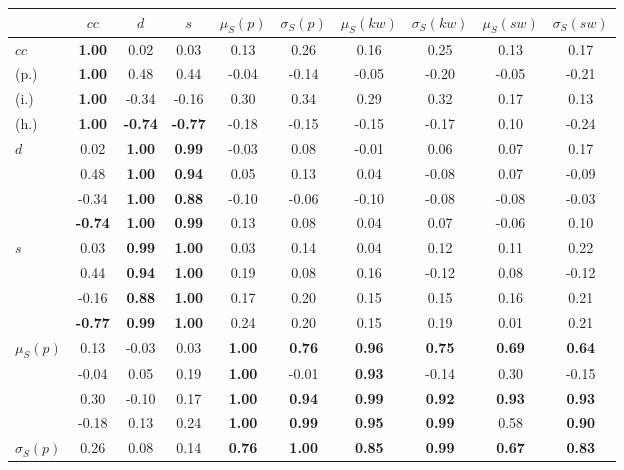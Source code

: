 \begin{table*}[h!]
\begin{center}
\begin{tabular}{| l || c | c | c | c | c | c | c | c | c |}\hline
 & $cc$ & $d$ & $s$ & $\mu_S(p)$ & $\sigma_S(p)$ & $\mu_S(kw)$ & $\sigma_S(kw)$ & $\mu_S(sw)$ & $\sigma_S(sw)$ \\\hline\hline
$cc$ & {\bf 1.00} & 0.02 & 0.03 & 0.13 & 0.26 & 0.16 & 0.25 & 0.13 & 0.17 \\
(p.) & {\bf 1.00} & 0.48 & 0.44 & -0.04 & -0.14 & -0.05 & -0.20 & -0.05 & -0.21 \\
(i.) & {\bf 1.00} & -0.34 & -0.16 & 0.30 & 0.34 & 0.29 & 0.32 & 0.17 & 0.13 \\
(h.) & {\bf 1.00} & {\bf -0.74} & {\bf -0.77} & -0.18 & -0.15 & -0.15 & -0.17 & 0.10 & -0.24 \\\hline
$d$ & 0.02 & {\bf 1.00} & {\bf 0.99} & -0.03 & 0.08 & -0.01 & 0.06 & 0.07 & 0.17 \\
 & 0.48 & {\bf 1.00} & {\bf 0.94} & 0.05 & 0.13 & 0.04 & -0.08 & 0.07 & -0.09 \\
 & -0.34 & {\bf 1.00} & {\bf 0.88} & -0.10 & -0.06 & -0.10 & -0.08 & -0.08 & -0.03 \\
 & {\bf -0.74} & {\bf 1.00} & {\bf 0.99} & 0.13 & 0.08 & 0.04 & 0.07 & -0.06 & 0.10 \\\hline
$s$ & 0.03 & {\bf 0.99} & {\bf 1.00} & 0.03 & 0.14 & 0.04 & 0.12 & 0.11 & 0.22 \\
 & 0.44 & {\bf 0.94} & {\bf 1.00} & 0.19 & 0.08 & 0.16 & -0.12 & 0.08 & -0.12 \\
 & -0.16 & {\bf 0.88} & {\bf 1.00} & 0.17 & 0.20 & 0.15 & 0.15 & 0.16 & 0.21 \\
 & {\bf -0.77} & {\bf 0.99} & {\bf 1.00} & 0.24 & 0.20 & 0.15 & 0.19 & 0.01 & 0.21 \\\hline
$\mu_S(p)$ & 0.13 & -0.03 & 0.03 & {\bf 1.00} & {\bf 0.76} & {\bf 0.96} & {\bf 0.75} & {\bf 0.69} & {\bf 0.64} \\
 & -0.04 & 0.05 & 0.19 & {\bf 1.00} & -0.01 & {\bf 0.93} & -0.14 & 0.30 & -0.15 \\
 & 0.30 & -0.10 & 0.17 & {\bf 1.00} & {\bf 0.94} & {\bf 0.99} & {\bf 0.92} & {\bf 0.93} & {\bf 0.93} \\
 & -0.18 & 0.13 & 0.24 & {\bf 1.00} & {\bf 0.99} & {\bf 0.95} & {\bf 0.99} & 0.58 & {\bf 0.90} \\\hline
$\sigma_S(p)$ & 0.26 & 0.08 & 0.14 & {\bf 0.76} & {\bf 1.00} & {\bf 0.85} & {\bf 0.99} & {\bf 0.67} & {\bf 0.83} \\

\end{tabular}
\end{center}
\end{table*}
